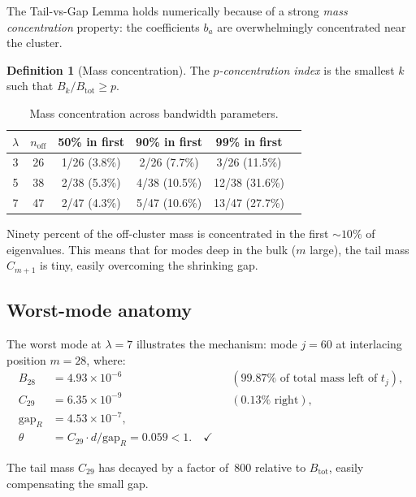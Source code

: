 \documentclass[12pt,a4paper]{article}
\theoremstyle{definition}
\newtheorem{definition}[theorem]{Definition}
\theoremstyle{remark}
\newcommand{\off}{\mathrm{off}}
\begin{document}
The Tail-vs-Gap Lemma holds numerically because of a strong
\emph{mass concentration} property: the coefficients $b_a$ are
overwhelmingly concentrated near the cluster.

\begin{definition}[Mass concentration]
The \emph{$p$-concentration index} is the smallest $k$ such that
$B_k / B_{\mathrm{tot}} \geq p$.
\end{definition}

\begin{table}[h]
\centering
\caption{Mass concentration across bandwidth parameters.}
\label{tab:mass}
\begin{tabular}{cccccc}
\toprule
$\lambda$ & $n_{\off}$ & 50\% in first & 90\% in first & 99\% in first \\
\midrule
3 & 26 & 1/26 (3.8\%) & 2/26 (7.7\%) & 3/26 (11.5\%) \\
5 & 38 & 2/38 (5.3\%) & 4/38 (10.5\%) & 12/38 (31.6\%) \\
7 & 47 & 2/47 (4.3\%) & 5/47 (10.6\%) & 13/47 (27.7\%) \\
\bottomrule
\end{tabular}
\end{table}

Ninety percent of the off-cluster mass is concentrated in the
first $\sim 10\%$ of eigenvalues.
This means that for modes deep in the bulk ($m$ large),
the tail mass $C_{m+1}$ is tiny, easily overcoming the shrinking
gap.

\subsection{Worst-mode anatomy}

The worst mode at $\lambda = 7$ illustrates the mechanism:
mode $j = 60$ at interlacing position $m = 28$, where:
\begin{align*}
B_{28} &= 4.93 \times 10^{-6} && (99.87\% \text{ of total mass left of } t_j), \\
C_{29} &= 6.35 \times 10^{-9} && (0.13\% \text{ right}), \\
\text{gap}_R &= 4.53 \times 10^{-7}, \\
\theta &= C_{29} \cdot d / \text{gap}_R = 0.059 < 1. \quad \checkmark
\end{align*}

The tail mass $C_{29}$ has decayed by a factor of~$800$ relative
to $B_{\mathrm{tot}}$, easily compensating the small gap.

\end{document}
